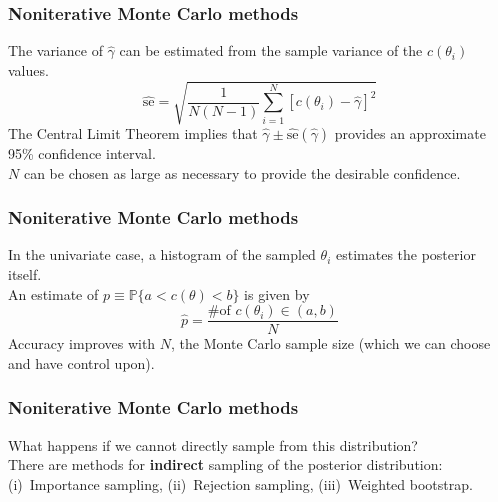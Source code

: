 \documentclass{beamer}
\renewcommand{\P}{\mathbb{P}}
\newcommand{\1}{\ensuremath{\mathbf{1}}}
\begin{document}
%
%
%
\begin{frame}\frametitle{Noniterative Monte Carlo methods}
	The variance of $\hat\gamma$ can be estimated from the sample variance of the $c(\theta_i)$ values.
	\begin{equation}
		\hat{\text{se}} = \sqrt{\frac{1}{N(N-1)}\sum_{i=1}^N [c(\theta_i) - \hat\gamma]^2}
	\end{equation}
	The Central Limit Theorem implies that $\hat\gamma \pm \hat{\text{se}}(\hat\gamma)$ provides an approximate 95\% confidence interval.\\
	$N$ can be chosen as large as necessary to provide the desirable confidence.
\end{frame}
%
%
%
\begin{frame}\frametitle{Noniterative Monte Carlo methods}
	In the univariate case, a histogram of the sampled $\theta_i$ estimates the posterior itself.\\[1.5ex]
	An estimate of $p \equiv \P\{a < c(\theta) < b\}$ is given by
	\begin{equation}
		\hat{p} = \frac{\text{\# of $c(\theta_i) \in (a,b)$}}{N}
	\end{equation}
	Accuracy improves with $N$, the Monte Carlo sample size (which we can choose and have control upon).
\end{frame}
%
%
%
\begin{frame}\frametitle{Noniterative Monte Carlo methods}
	What happens if we cannot directly sample from this distribution?\\
	There are methods for \textbf{indirect} sampling of the posterior distribution: (i)~Importance sampling, (ii)~Rejection sampling, (iii)~Weighted bootstrap.
\end{frame}
%
%
%
\end{document}
